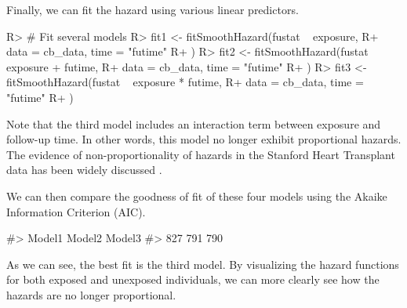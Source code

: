 \documentclass[
]{jss}
\begin{document}
Finally, we can fit the hazard using various linear predictors.

\begin{CodeChunk}

\begin{CodeInput}
R> # Fit several models
R> fit1 <- fitSmoothHazard(fustat ~ exposure,
R+   data = cb_data, time = "futime"
R+ )
R> fit2 <- fitSmoothHazard(fustat ~ exposure + futime,
R+   data = cb_data, time = "futime"
R+ )
R> fit3 <- fitSmoothHazard(fustat ~ exposure * futime,
R+   data = cb_data, time = "futime"
R+ )
\end{CodeInput}
\end{CodeChunk}

Note that the third model includes an interaction term between exposure
and follow-up time. In other words, this model no longer exhibit
proportional hazards. The evidence of non-proportionality of hazards in
the Stanford Heart Transplant data has been widely discussed
\citep{arjas1988graphical}.

We can then compare the goodness of fit of these four models using the
Akaike Information Criterion (AIC).

\begin{CodeChunk}

\begin{CodeOutput}
#> Model1 Model2 Model3 
#>    827    791    790
\end{CodeOutput}
\end{CodeChunk}

As we can see, the best fit is the third model. By visualizing the
hazard functions for both exposed and unexposed individuals, we can more
clearly see how the hazards are no longer proportional.
\end{document}
